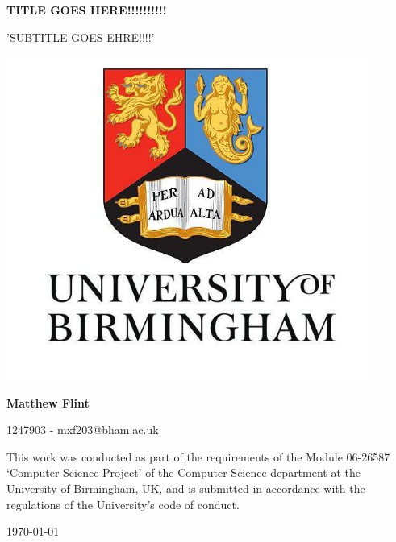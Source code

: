 \documentclass{article}
\begin{document}
    \begin{center}
        \LARGE
        \textbf{TITLE GOES HERE!!!!!!!!!!}
        
        \vspace{0.2cm}
        \large
        'SUBTITLE GOES EHRE!!!!'
        
        \vspace{1cm}
        \includegraphics[width=0.9\textwidth]{university}

        \vfill
        
        \large
        \textbf{Matthew Flint}
        
        \vspace{0.3cm}
        \normalsize
        1247903 - mxf203@bham.ac.uk
        
        \vspace{0.5cm}
		This work was conducted as part of the requirements of the Module 06-26587 `Computer Science Project' of the Computer Science department at the University of Birmingham, UK, and is submitted in accordance with the regulations of the University's code of conduct.
		
		\vspace{0.2cm}
		\today
		
    \end{center}
    \newpage
\end{document}
